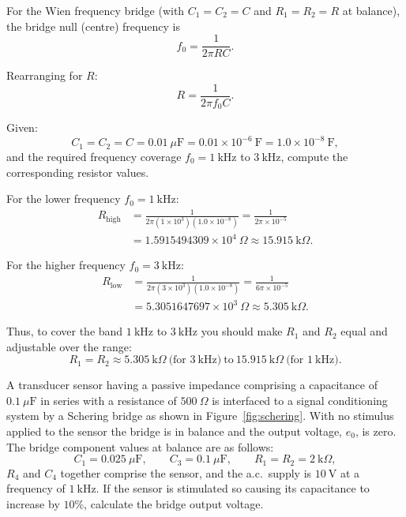 \begin{solutionblock}
\noindent
For the Wien frequency bridge (with \(C_1=C_2=C\) and \(R_1=R_2=R\) at balance), the bridge null (centre) frequency is
\[
f_0=\frac{1}{2\pi R C}.
\]

\noindent
Rearranging for \(R\):
\[
R=\frac{1}{2\pi f_0 C}.
\]

\noindent
Given:
\[
C_1=C_2=C=0.01~\mu\text{F}=0.01\times10^{-6}~\text{F}=1.0\times10^{-8}~\text{F},
\]
and the required frequency coverage \(f_0=1\ \text{kHz}\) to \(3\ \text{kHz}\), compute the corresponding resistor values.

\noindent
For the lower frequency \(f_0=1\ \text{kHz}\):
\begin{align*}
    R_{\text{high}} &= \frac{1}{2\pi(1\times10^{3})(1.0\times10^{-8})}
    = \frac{1}{2\pi\times10^{-5}}\\[4pt]
    &= 1.5915494309\times10^{4}~\Omega
    \approx 15.915~\text{k}\Omega.
\end{align*}

\noindent
For the higher frequency \(f_0=3\ \text{kHz}\):
\begin{align*}
    R_{\text{low}} &= \frac{1}{2\pi(3\times10^{3})(1.0\times10^{-8})}
    = \frac{1}{6\pi\times10^{-5}}\\[4pt]
    &= 5.3051647697\times10^{3}~\Omega
    \approx 5.305~\text{k}\Omega.
\end{align*}

\bigskip
\noindent
Thus, to cover the band \(1\ \text{kHz}\) to \(3\ \text{kHz}\) you should make \(R_1\) and \(R_2\) equal and adjustable over the range:
\[
\boxed{R_1=R_2 \approx 5.305\ \text{k}\Omega\ \text{(for }3\ \text{kHz}\text{)} \ \text{to}\ 
15.915\ \text{k}\Omega\ \text{(for }1\ \text{kHz}\text{).}}
\]

\end{solutionblock}




A transducer sensor having a passive impedance comprising a capacitance of \(0.1\ \mu\mathrm{F}\) in series with a resistance of \(500\ \Omega\) is interfaced to a signal conditioning system by a Schering bridge as shown in Figure~\ref{fig:schering}. With no stimulus applied to the sensor the bridge is in balance and the output voltage, \(e_0\), is zero. The bridge component values at balance are as follows:
\[
C_1 = 0.025\ \mu\mathrm{F}, \qquad C_3 = 0.1\ \mu\mathrm{F}, \qquad R_1 = R_2 = 2\ \text{k}\Omega,
\]
\(R_4\) and \(C_4\) together comprise the sensor, and the a.c.\ supply is \(10\ \mathrm{V}\) at a frequency of \(1\ \mathrm{kHz}\). If the sensor is stimulated so causing its capacitance to increase by \(10\%\), calculate the bridge output voltage.

